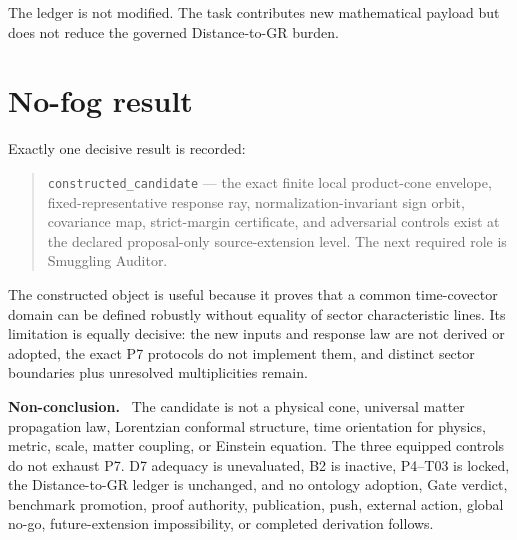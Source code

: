 \documentclass[11pt]{article}
\newenvironment{nonconclusion}{\par\smallskip\noindent\textbf{Non-conclusion.}\ }{\par\smallskip}
\begin{document}
The ledger is not modified.  The task contributes new mathematical payload but
does not reduce the governed Distance-to-GR burden.

\section{No-fog result}

Exactly one decisive result is recorded:
\begin{quote}
\texttt{constructed\_candidate} --- the exact finite local product-cone
envelope, fixed-representative response ray, normalization-invariant sign
orbit, covariance map, strict-margin certificate, and adversarial controls
exist at the declared proposal-only source-extension level.  The next
required role is Smuggling Auditor.
\end{quote}

The constructed object is useful because it proves that a common time-covector
domain can be defined robustly without equality of sector characteristic
lines.  Its limitation is equally decisive: the new inputs and response
law are not derived or adopted, the exact P7 protocols do not implement them,
and distinct sector boundaries plus unresolved multiplicities remain.

\begin{nonconclusion}
The candidate is not a physical cone, universal matter propagation law,
Lorentzian conformal structure, time orientation for physics, metric, scale,
matter coupling, or Einstein equation.  The three equipped controls do not
exhaust P7.  D7 adequacy is unevaluated, B2 is inactive, P4--T03 is locked,
the Distance-to-GR ledger is unchanged, and no ontology adoption, Gate
verdict, benchmark promotion, proof authority, publication, push, external
action, global no-go, future-extension impossibility, or completed derivation
follows.
\end{nonconclusion}
\end{document}
